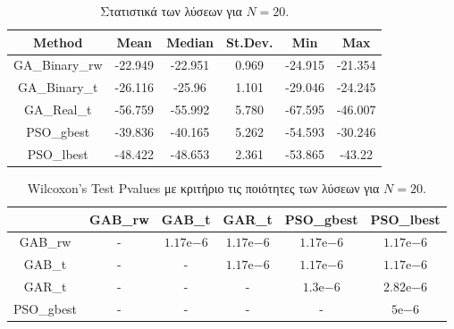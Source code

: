 \documentclass[12pt, a4paper]{article}
\newcommand{\en}{\selectlanguage{english}}
\newcommand{\gr}{\selectlanguage{greek}}
\begin{document}
\begin{table}[H]
	\centering
	\begin{tabular}{| c | c | c | c | c | c |}
		
		\hline
		\en Method & \en Mean & \en Median & \en St.Dev. & \en Min & \en Max \\
		
		\hline
		\en GA\_Binary\_rw & -22.949 & -22.951 & 0.969 & -24.915 & -21.354 \\ 
		
		\hline
		\en GA\_Binary\_t & -26.116 & -25.96 & 1.101 & -29.046 & -24.245 \\ 
		
		\hline
		\en GA\_Real\_t & -56.759 & -55.992 & 5.780 & -67.595 & -46.007 \\ 
		
		\hline
		\en PSO\_gbest & -39.836 & -40.165 & 5.262 & -54.593 & -30.246\\ 
		
		\hline
		\en PSO\_lbest & -48.422 & -48.653 & 2.361 & -53.865 & -43.22\\ 
		\hline
		
	\end{tabular}
	\caption{Στατιστικά των λύσεων για $N = 20$.}
	\label{tab:sol_qual_N20}
\end{table}

\begin{table}[H]
	\centering
	\begin{tabular}{| c | c | c | c | c | c |}
		
		\hline
		\en  & \en GAB\_rw & \en GAB\_t & \en GAR\_t & \en PSO\_gbest & \en PSO\_lbest\\
		
		\hline
		\en GAB\_rw & - & $1.17\mathrm{e}{-6}$ & $1.17\mathrm{e}{-6}$ & $1.17\mathrm{e}{-6}$ & $1.17\mathrm{e}{-6}$ \\ 
		
		\hline
		\en GAB\_t & - & - & $1.17\mathrm{e}{-6}$ &  $1.17\mathrm{e}{-6}$ & $1.17\mathrm{e}{-6}$ \\ 
		
		\hline
		\en GAR\_t & - & - & - & $1.3\mathrm{e}{-6}$ & $2.82\mathrm{e}{-6}$ \\ 
		
		\hline
		\en PSO\_gbest & - & - & - & - & $5\mathrm{e}{-6}$\\ 
		
		\hline
		
	\end{tabular}
	\caption{\en Wilcoxon's Test Pvalues \gr με κριτήριο τις ποιότητες των λύσεων για $N = 20$.}
	\label{tab:sol_qual_pval_N20}
\end{table}
\end{document}
